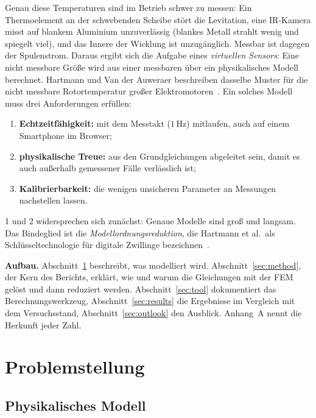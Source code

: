 \documentclass[a4paper, 10pt, conference]{ieeeconf}
\theoremstyle{remark}
\begin{document}
Genau diese Temperaturen sind im Betrieb schwer zu messen: Ein
Thermoelement an der schwebenden Scheibe stört die Levitation, eine
IR-Kamera misst auf blankem Aluminium unzuverlässig (blankes Metall strahlt
wenig und spiegelt viel), und das Innere der Wicklung ist unzugänglich.
Messbar ist dagegen der Spulenstrom. Daraus ergibt sich die Aufgabe eines
\emph{virtuellen Sensors}: Eine nicht messbare Größe wird aus einer
messbaren über ein physikalisches Modell berechnet. Hartmann und
Van der Auweraer beschreiben dasselbe Muster für die nicht messbare
Rotortemperatur großer Elektromotoren~\cite{hartmann2025golden}. Ein solches
Modell muss drei Anforderungen erfüllen:
\begin{enumerate}[leftmargin=*, nosep]
  \item \textbf{Echtzeitfähigkeit:} mit dem Messtakt ($1\,$Hz) mitlaufen,
        auch auf einem Smartphone im Browser;
  \item \textbf{physikalische Treue:} aus den Grundgleichungen abgeleitet
        sein, damit es auch außerhalb gemessener Fälle verlässlich ist;
  \item \textbf{Kalibrierbarkeit:} die wenigen unsicheren Parameter an
        Messungen nachstellen lassen.
\end{enumerate}
1 und 2 widersprechen sich zunächst: Genaue Modelle sind groß und langsam.
Das Bindeglied ist die \emph{Modellordnungsreduktion}, die Hartmann et al.\
als Schlüsseltechnologie für digitale Zwillinge bezeichnen~\cite{hartmann2018mor}.

\textbf{Aufbau.} Abschnitt~\ref{sec:problem} beschreibt, was modelliert
wird. Abschnitt~\ref{sec:method}, der Kern des Berichts, erklärt, wie und
warum die Gleichungen mit der FEM gelöst und dann reduziert werden.
Abschnitt~\ref{sec:tool} dokumentiert das Berechnungswerkzeug,
Abschnitt~\ref{sec:results} die Ergebnisse im Vergleich mit dem
Versuchsstand, Abschnitt~\ref{sec:outlook} den Ausblick. Anhang~A nennt die
Herkunft jeder Zahl.

\section{Problemstellung}
\label{sec:problem}

\subsection{Physikalisches Modell}
\label{sec:phys}
\end{document}
